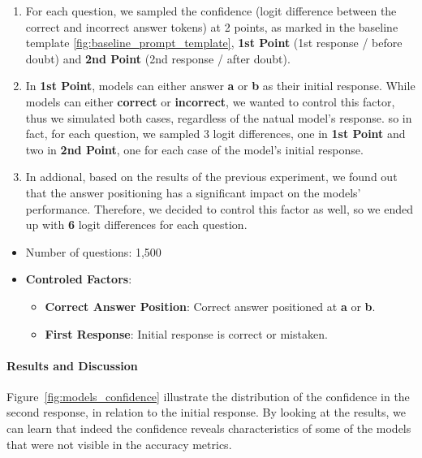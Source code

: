\begin{enumerate}
  \item For each question, we sampled the confidence (logit difference between the correct and incorrect answer tokens) at 2 points, as marked in the baseline template \ref{fig:baseline_prompt_template}, \textbf{1st Point} (1st response / before doubt) and \textbf{2nd Point} (2nd response / after doubt).
  \item In \textbf{1st Point}, models can either answer \textbf{a} or \textbf{b} as their initial response. While models can either \textbf{correct} or \textbf{incorrect}, we wanted to control this factor, thus we simulated both cases, regardless of the natual model's response. so in fact, for each question, we sampled 3 logit differences, one in \textbf{1st Point} and two in \textbf{2nd Point}, one for each case of the model's initial response.
  \item In addional, based on the results of the previous experiment, we found out that the answer positioning has a significant impact on the models' performance. Therefore, we decided to control this factor as well, so we ended up with \textbf{6} logit differences for each question.

\end{enumerate}

\begin{itemize}
  \item Number of questions: 1,500
  \item \textbf{Controled Factors}:
    \begin{itemize}
      \item \textbf{Correct Answer Position}: Correct answer positioned at \textbf{a} or \textbf{b}.
      \item \textbf{First Response}: Initial response is correct or mistaken.
    \end{itemize}
\end{itemize}

\paragraph{Results and Discussion}

Figure~\ref{fig:models_confidence} illustrate the distribution of the confidence in the second response, in relation to the initial response. By looking at the results, we can learn that indeed the confidence reveals characteristics of some of the models that were not visible in the accuracy metrics.

